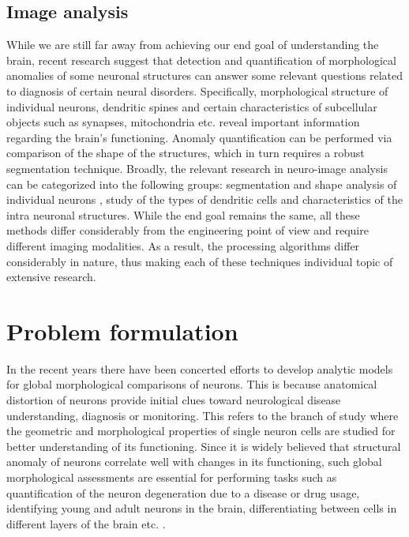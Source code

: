 \subsection{Image analysis}
While we are still far away from achieving our end goal of understanding the brain, recent research suggest that detection and quantification of morphological anomalies of some neuronal structures can answer some relevant questions related to diagnosis of certain neural disorders. Specifically, morphological structure of individual neurons, dendritic spines and certain characteristics of subcellular objects such as synapses, mitochondria etc. reveal important information regarding the brain’s functioning. Anomaly quantification can be performed via comparison of the shape of the structures, which in turn requires a robust segmentation technique. Broadly, the relevant research in neuro-image analysis can be categorized into the following groups: segmentation and shape analysis of individual neurons \cite{dima_wavalet,mukherjee_T2T_2,mukherjee_TuFF,rodriguez_voxelscoop,peng_GAD}, study of the types of dendritic cells and characteristics of the intra neuronal structures\cite{5613939,6008641,6971126,EMmembrane_nguyen}. While the end goal remains the same, all these methods differ considerably from the engineering point of view and require different imaging modalities. As a result, the processing algorithms differ considerably in nature, thus making each of these techniques individual topic of extensive research.

\section{Problem formulation}
In the recent years there have been concerted efforts to develop analytic models for global morphological comparisons of neurons. This is because anatomical distortion of neurons provide initial clues toward neurological disease understanding, diagnosis or  monitoring. 
This refers to the branch of study where the geometric and morphological properties of single neuron cells are studied for better understanding of its functioning. Since it is widely believed that structural anomaly of neurons correlate well with changes in its functioning, such global morphological assessments are essential for performing  tasks such as quantification of the neuron degeneration due to a disease or drug usage, identifying young and adult neurons in the brain, differentiating between cells in different layers of the brain etc. \cite{vaccari2012assessment,neuron_structure,cuntz_neuron,barry_branching,barry_serotonergic,bio_belichenko1994rett}.

